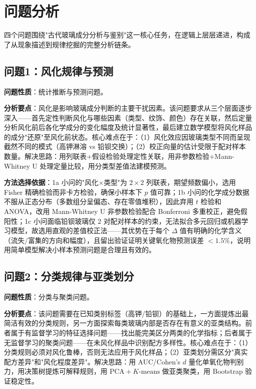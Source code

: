 \section{问题分析}

四个问题围绕"古代玻璃成分分析与鉴别"这一核心任务，在逻辑上层层递进，构成了从现象描述到规律挖掘的完整分析链条。

\subsection{问题1：风化规律与预测}

\textbf{问题性质}：统计推断与预测问题。

\textbf{分析要点}：风化是影响玻璃成分判断的主要干扰因素。该问题要求从三个层面逐步深入——首先定性判断风化与哪些因素（类型、纹饰、颜色）存在关联，然后定量分析风化前后各化学成分的变化幅度及统计显著性，最后建立数学模型将风化样品的成分"还原"至风化前状态。核心难点在于：（1）风化效应因玻璃类型不同而呈现截然不同的模式（高钾淋溶 vs 铅钡交换）；（2）校正向量的估计受限于配对样本数量。解决思路：用列联表$+$假设检验处理定性关联，用非参数检验$+$Mann-Whitney U 处理定量比较，用分类型差值法建模预测。

\textbf{方法选择依据}：1a 小问的"风化$\times$类型"为 $2 \times 2$ 列联表，期望频数偏小，选用 Fisher 精确检验而非卡方检验，确保小样本下 $p$ 值可靠；1b 小问的化学成分数据不服从正态分布（多数组分呈偏态、存在零值堆积），因此弃用 $t$ 检验和 ANOVA，改用 Mann-Whitney U 非参数检验配合 Bonferroni 多重校正，避免假阳性；1c 小问面临铅钡玻璃仅 2 对配对样本的约束，无法拟合多元回归或机器学习模型，故选用直观的差值校正法——其优势在于每个 $\Delta$ 值有明确的化学含义（流失/富集的方向和幅度），且留出验证证明关键氧化物预测误差 $< 1.5\%$，说明用简单模型解决小样本预测问题是合理且有效的。

\subsection{问题2：分类规律与亚类划分}

\textbf{问题性质}：分类与聚类问题。

\textbf{分析要点}：该问题需要在已知类别标签（高钾/铅钡）的基础上，一方面提炼出最简洁有效的分类规则，另一方面探索每类玻璃内部是否存在有意义的亚类结构。前者属于有监督学习的特征选择问题——找出能完美区分两类的化学指标；后者属于无监督学习的聚类问题——在未风化样品中识别配方多样性。核心难点在于：（1）分类规则必须对风化鲁棒，否则无法应用于风化样品；（2）亚类划分需区分"真实配方差异"和"风化程度差异"。解决思路：用 AUC/Cohen's $d$ 量化单氧化物判别力，用决策树提炼可解释规则，用 $\text{PCA} + K\text{-means}$ 做亚类聚类，用 Bootstrap 验证稳定性。

